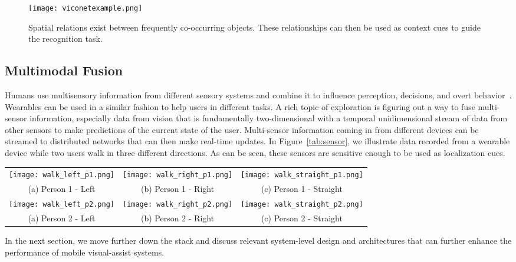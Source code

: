 \begin{figure}[!htb]
\centering
\texttt{[image: viconetexample.png]}
\caption{Spatial relations exist between frequently co-occurring objects. These relationships can then be used as context cues to guide the recognition task.}
\label{fig:viconet}
\end{figure} 

\subsection{Multimodal Fusion}
Humans use multisensory information from different sensory systems and combine it to influence 
perception, decisions, and overt behavior~\cite{stein2009neural}. Wearables can be used in a similar fashion to help users in different tasks. 
A rich topic of exploration is figuring out a way to fuse multi-sensor information, especially data from vision that is fundamentally two-dimensional with a temporal 
unidimensional stream of data from other sensors to make predictions of the current state of the user. Multi-sensor information coming in from different devices can be 
streamed to distributed networks that can then make real-time updates. In Figure~\ref{tab:sensor}, we illustrate data recorded from a wearable device while two users
walk in three different directions. As can be seen, these sensors are sensitive enough to be used as localization cues. 

\begin{figure*}[!htb]
\centering
\begin{tabular}{@{}c@{} @{}c@{} @{}c@{}}
\vspace{-5pt}
\texttt{[image: walk\_left\_p1.png]} & \texttt{[image: walk\_right\_p1.png]} & \texttt{[image: walk\_straight\_p1.png]}\\[\abovecaptionskip]
\small(a) Person 1 - Left & \small (b) Person 1 - Right & \small (c) Person 1 - Straight\\
\texttt{[image: walk\_left\_p2.png]} & \texttt{[image: walk\_right\_p2.png]} & \texttt{[image: walk\_straight\_p2.png]}\\[\abovecaptionskip]
\small(a) Person 2 - Left & \small (b) Person 2 - Right & \small (c) Person 2 - Straight\\
\end{tabular}
\caption{Temporal sensor information used for localization.}
\label{tab:sensor}
\end{figure*}

In the next section, we move further down the stack and discuss relevant system-level design and architectures that can further enhance the performance of mobile 
visual-assist systems. 
